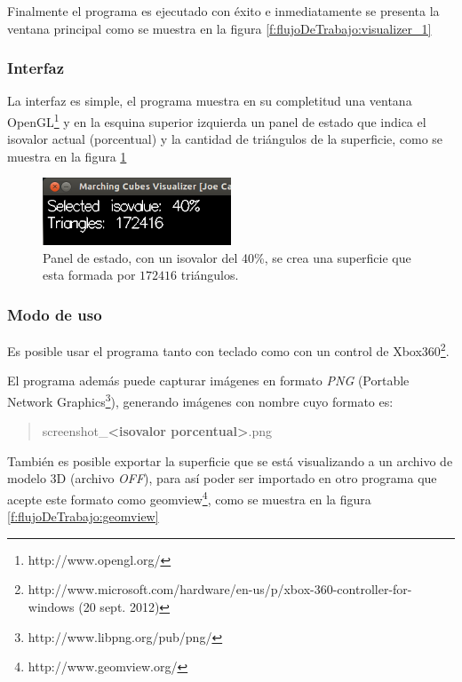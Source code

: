 Finalmente el programa es ejecutado con éxito e inmediatamente se presenta la ventana principal como se muestra en la figura \ref{f:flujoDeTrabajo:visualizer_1}

\subsubsection{Interfaz}
\label{ch:propuesta:sec:extraccionDeLaSuperficie:subsec:interfaz}

La interfaz es simple, el programa muestra en su completitud una ventana OpenGL\footnote{http://www.opengl.org/} y en la esquina superior izquierda un panel de estado que indica el isovalor actual (porcentual) y la cantidad de triángulos de la superficie, como se muestra en la figura \ref{f:flujoDeTrabajo:interface}

\begin{figure}[h]
\centering
	\includegraphics[width=0.5\textwidth]{images/visualizer/interface.png}
\caption{Panel de estado, con un isovalor del 40\%, se crea una superficie que esta formada por $172416$ triángulos.}
\label{f:flujoDeTrabajo:interface}
\end{figure}

\subsubsection{Modo de uso}
\label{ch:propuesta:sec:extraccionDeLaSuperficie:subsec:modoDeUso}

Es posible usar el programa tanto con teclado como con un control de Xbox360\textsuperscript{\textregistered}\footnote{http://www.microsoft.com/hardware/en-us/p/xbox-360-controller-for-windows (20 sept. 2012)}.

El programa además puede capturar imágenes en formato \emph{PNG} (Portable Network \mbox{Graphics}\footnote{http://www.libpng.org/pub/png/}), generando imágenes con nombre cuyo formato es:

\begin{quote}
	screenshot\_\textbf{\textless isovalor porcentual\textgreater}.png
\end{quote}

También es posible exportar la superficie que se está visualizando a un archivo de modelo 3D (archivo \emph{OFF}), para así poder ser importado en otro programa que acepte este formato como geomview\footnote{http://www.geomview.org/}, como se muestra en la figura \ref{f:flujoDeTrabajo:geomview}

